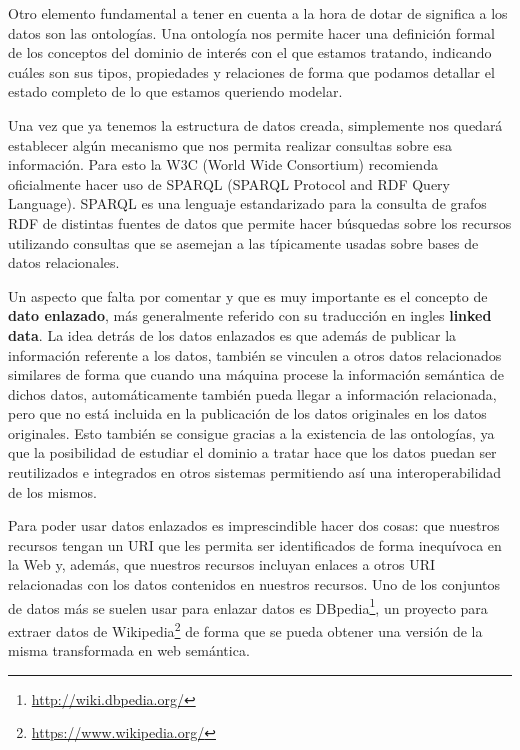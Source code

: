 \bigskip

Otro elemento fundamental a tener en cuenta a la hora de dotar de significa a los datos son las ontologías. Una ontología nos permite hacer una definición formal de los conceptos del dominio de interés con el que estamos tratando, indicando cuáles son sus tipos, propiedades y relaciones de forma que podamos detallar el estado completo de lo que estamos queriendo modelar.

\bigskip
Una vez que ya tenemos la estructura de datos creada, simplemente nos quedará establecer algún mecanismo que nos permita realizar consultas sobre esa información. Para esto la {\sf W3C (World Wide Consortium)} recomienda oficialmente hacer uso de {\sf SPARQL (SPARQL Protocol and RDF Query Language)}. {\sf SPARQL} es una lenguaje estandarizado para la consulta de grafos {\sf RDF} de distintas fuentes de datos que permite hacer búsquedas sobre los recursos utilizando consultas que se asemejan a las típicamente usadas sobre bases de datos relacionales.

\bigskip

Un aspecto que falta por comentar y que es muy importante es el concepto de \textbf{dato enlazado}, más generalmente referido con su traducción en ingles \textbf{linked data}. La idea detrás de los datos enlazados es que además de publicar la información referente a los datos, también se vinculen a otros datos relacionados similares de forma que cuando una máquina procese la información semántica de dichos datos, automáticamente también pueda llegar a información relacionada, pero que no está incluida en la publicación de los datos originales en los datos originales. Esto también se consigue gracias a la existencia de las ontologías, ya que la posibilidad de estudiar el dominio a tratar hace que los datos puedan ser reutilizados e integrados en otros sistemas permitiendo así una interoperabilidad de los mismos.

\bigskip
Para poder usar datos enlazados es imprescindible hacer dos cosas: que nuestros recursos tengan un {\sf URI} que les permita ser identificados de forma inequívoca en {\sf la Web} y, además, que nuestros recursos incluyan enlaces a otros {URI} relacionadas con los datos contenidos en nuestros recursos. Uno de los conjuntos de datos más se suelen usar para enlazar datos es {\sf DBpedia\footnote{\url{http://wiki.dbpedia.org/}}}, un proyecto para extraer datos de {\sf Wikipedia\footnote{\url{https://www.wikipedia.org/}}} de forma que se pueda obtener una versión de la misma transformada en web semántica.

